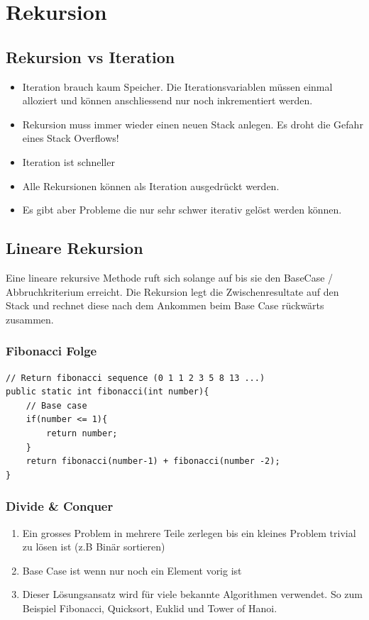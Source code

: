 \section{Rekursion}
\subsection{Rekursion vs Iteration}
\begin{itemize}
	\item Iteration brauch kaum Speicher. Die Iterationsvariablen müssen einmal alloziert und können anschliessend nur noch inkrementiert werden.
	\item Rekursion muss immer wieder einen neuen Stack anlegen. Es droht die Gefahr eines Stack Overflows!
	\item Iteration ist schneller
	\item Alle Rekursionen können als Iteration ausgedrückt werden.
	\item Es gibt aber Probleme die nur sehr schwer iterativ gelöst werden können. 
\end{itemize}

\subsection{Lineare Rekursion}
Eine lineare rekursive Methode ruft sich solange auf bis sie den BaseCase / Abbruchkriterium erreicht. Die Rekursion legt die Zwischenresultate auf den Stack und rechnet diese nach dem Ankommen beim Base Case rückwärts zusammen.

\subsubsection{Fibonacci Folge}
\begin{lstlisting}
// Return fibonacci sequence (0 1 1 2 3 5 8 13 ...)
public static int fibonacci(int number){
	// Base case
	if(number <= 1){
		return number;
	} 
	return fibonacci(number-1) + fibonacci(number -2);
}
\end{lstlisting}

\subsubsection{Divide \& Conquer}
\begin{enumerate}
	\item Ein grosses Problem in mehrere Teile zerlegen bis ein kleines Problem trivial zu lösen ist (z.B Binär sortieren)
	\item Base Case ist wenn nur noch ein Element vorig ist
	\item Dieser Lösungsansatz wird für viele bekannte Algorithmen verwendet. So zum Beispiel Fibonacci, Quicksort, Euklid und Tower of Hanoi.
\end{enumerate}

